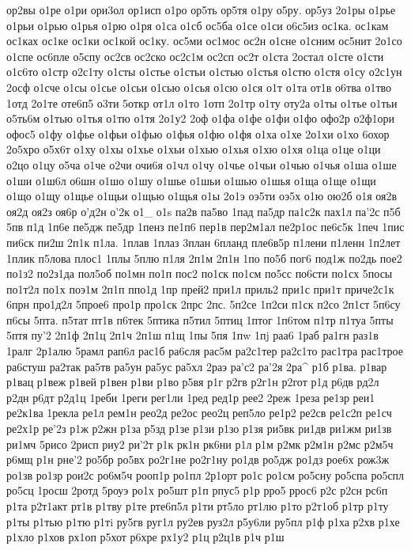 {{ор2вы
о1ре
о1ри
ори3ол
ор1исп
о1ро
ор5ть
ор5тя
о1ру
о5ру.
ор5уз
2о1ры
о1рье
о1рьи
о1рью
о1рья
о1рю
о1ря
о1са
о1сб
ос5ба
о1се
о1си
о6с5из
ос1ка.
ос1кам
ос1ках
ос1ке
ос1ки
ос1кой
ос1ку.
ос5ми
ос1мос
ос2н
о1сне
о1сним
ос5нит
2о1со
о1спе
ос6пле
о5спу
ос2св
ос2ско
ос2с1м
ос2сп
ос2т
о1ста
2остал
о1сте
о1сти
о1с6то
о1стр
о2с1ту
о1сты
о1стье
о1стьи
о1стью
о1стья
о1стю
о1стя
о1су
о2с1ун
2осф
о1сче
о1сы
о1сье
о1сьи
о1сью
о1сья
о1сю
о1ся
о1т
о1та
от1в
о6тва
о1тво
1отд
2о1те
оте6п5
о3ти
5откр
от1л
о1то
1отп
2о1тр
о1ту
оту2а
о1ты
о1тье
о1тьи
о5ть6м
о1тью
о1тья
о1тю
о1тя
2о1у2
2оф
о1фа
о1фе
о1фи
о1фо
офо2р
о2ф1ори
офос5
о1фу
о1фье
о1фьи
о1фью
о1фья
о1фю
о1фя
о1ха
о1хе
2о1хи
о1хо
6охор
2о5хро
о5х6т
о1ху
о1хы
о1хье
о1хьи
о1хью
о1хья
о1хю
о1хя
о1ца
о1це
о1ци
о2цо
о1цу
о5ча
о1че
о2чи
очи6я
о1чл
о1чу
о1чье
о1чьи
о1чью
о1чья
о1ша
о1ше
о1ши
о1ш6л
о6шн
о1шо
о1шу
о1шье
о1шьи
о1шью
о1шья
о1ща
о1ще
о1щи
о1що
о1щу
о1щье
о1щьи
о1щью
о1щья
о1ы
2о1э
оэ5ти
оэ5х
о1ю
ою2б
о1я
оя2в
оя2д
оя2з
оя6р
о'д2н
о'2к
о1_
о1s
па2в
па5во
1пад
па5др
па1с2к
пах1л
па'2с
п5б
5пв
п1д
1п6е
пе5дж
пе5др
1пенз
пе1п6
пер1в
пер2м1ал
пе2р1ос
пе6с5к
1печ
1пис
пи6ск
пи2ш
2п1к
п1ла.
1плав
1плаз
3план
6планд
пле6в5р
п1лени
п1ленн
1п2лет
1плик
п5лова
плос1
1плы
5плю
п1ля
2п1м
2п1н
1по
по5б
пог6
под1ж
по2дь
пое2
по1з2
по2з1да
пол5об
по1мн
по1п
пос2
по1ск
по1см
по5сс
по6сти
по1сх
5посы
по1т2л
по1х
поэ1м
2п1п
ппо1д
1пр
прей2
при1л
приль2
при1с
при1т
приче2с1к
6прн
про1д2л
5прое6
про1р
про1ск
2прс
2пс.
5п2се
1п2си
п1ск
п2со
2п1ст
5п6су
п6сы
5пта.
п5тат
пт1в
п6тек
5птика
п5тил
5птиц
1птог
1п6том
п1тр
п1туа
5пты
5птя
пу'2
2п1ф
2п1ц
2п1ч
2п1ш
п1щ
1пы
5пя
1пw
1пj
раа6
1раб
ра1гн
раз1в
1ралг
2р1алю
5рамл
рап6л
рас1б
ра6сля
рас5м
ра2с1тер
ра2с1то
рас1тра
рас1трое
ра6стуш
ра2так
ра5тв
ра5ун
ра5ус
ра5хл
2раэ
ра'с2
ра'2я
2ра^
р1б
р1ва.
р1вар
р1вац
р1веж
р1вей
р1вен
р1ви
р1во
р5вя
р1г
р2гв
р2г1н
р2гот
р1д
р6дв
рд2л
р2дн
р6дт
р2д1ц
1реби
1реги
рег1ли
1ред
ред1р
рее2
2реж
1реза
ре1зр
реи1
ре2к1ва
1рекла
ре1л
рем1н
рео2д
ре2ос
рео2ц
реп5ло
ре1р2
ре2св
ре1с2п
ре1сч
ре2х1р
ре'2з
р1ж
р2жн
р1за
р5зд
р1зе
р1зи
р1зо
р1зя
ри5вк
ри1дв
ри1жм
ри1зв
ри1мч
5рисо
2рисп
риу2
ри'2т
р1к
рк1н
рк6ни
р1л
р1м
р2мк
р2м1н
р2мс
р2м5ч
р6мщ
р1н
рне'2
ро5бр
ро5вх
ро2г1не
ро2г1ну
ро1дв
ро5дж
ро1дз
рое6х
рож3ж
ро1зв
ро1зр
рои2с
ро6м5ч
рооп1р
ро1пл
2р1орт
ро1с
ро1см
ро5сну
ро5спа
ро5спл
ро5сц
1росш
2ротд
5роуэ
ро1х
ро5шт
р1п
рпус5
р1р
рро5
ррос6
р2с
р2сн
рс6п
р1та
р2т1акт
рт1в
р1тву
р1те
рте6п5л
р1ти
рт5ло
рт1лю
р1то
р2т1об
р1тр
р1ту
р1ты
р1тью
р1тю
р1тi
ру5гв
руг1л
ру2ев
руз2л
р5у6ли
ру5пл
р1ф
р1ха
р2хв
р1хе
р1хло
р1хов
рх1оп
р5хот
р6хре
рх1у2
р1ц
р2ц1в
р1ч
р1ш
}}
